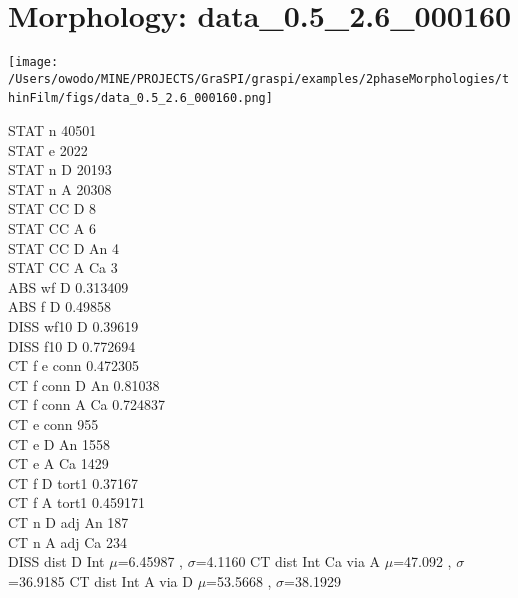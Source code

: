 \documentclass{article}
\begin{document}
\section{Morphology: data\_0.5\_2.6\_000160 }
\parbox{0.35\textwidth}{
\texttt{[image: /Users/owodo/MINE/PROJECTS/GraSPI/graspi/examples/2phaseMorphologies/thinFilm/figs/data\_0.5\_2.6\_000160.png]} \  
 ~\newline ~\newline 
\begin{small}
STAT n 40501\\
STAT e 2022\\
STAT n D 20193\\
STAT n A 20308\\
STAT CC D 8\\
STAT CC A 6\\
STAT CC D An 4\\
STAT CC A Ca 3\\
ABS wf D 0.313409\\
ABS f D 0.49858\\
DISS wf10 D 0.39619\\
DISS f10 D 0.772694\\
CT f e conn 0.472305\\
CT f conn D An 0.81038\\
CT f conn A Ca 0.724837\\
CT e conn 955\\
CT e D An 1558\\
CT e A Ca 1429\\
CT f D tort1 0.37167\\
CT f A tort1 0.459171\\
CT n D adj An 187\\
CT n A adj Ca 234\\

DISS dist D Int $\mu$=6.45987 , $\sigma$=4.1160 \newline
CT dist Int Ca via A $\mu$=47.092 , $\sigma$=36.9185 \newline
CT dist Int A via D $\mu$=53.5668 , $\sigma$=38.1929 \newline
\end{small}
}
\end{document}

